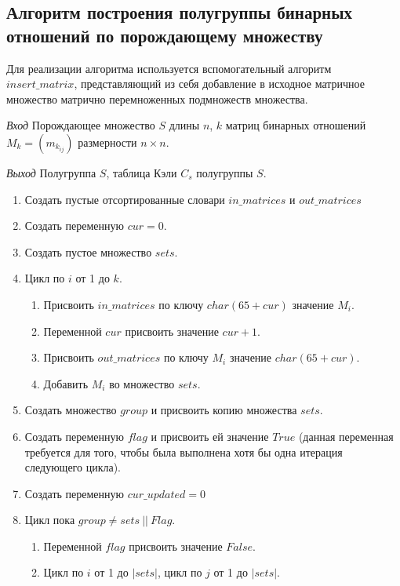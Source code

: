\documentclass[bachelor, och, labwork]{shiza}
\begin{document}
\subsection{Алгоритм построения полугруппы бинарных отношений по порождающему множеству}

Для реализации алгоритма используется вспомогательный алгоритм\\ $insert\_matrix$,
представляющий из себя добавление в исходное матричное множество матрично перемноженных 
подмножеств множества.

\textit{Вход} Порождающее множество $S$ длины $n$, $k$ матриц бинарных отношений 
$M_k = (m_{k_{ij}})$ размерности $n \times n$.

\textit{Выход} Полугруппа $S$, таблица Кэли $C_s$ полугруппы $S$.

\begin{enumerate}
    \item Создать пустые отсортированные словари $in\_matrices$ и  $out\_matrices$
    \item Создать переменную $cur=0$.
    \item Создать пустое множество $sets$.
    \item Цикл по $i$ от 1 до $k$.
        \begin{enumerate}
            \item Присвоить $in\_matrices$ по ключу $char(65 + cur)$ значение $M_i$.
            \item Переменной $cur$ присвоить значение $cur+1$.
            \item Присвоить $out\_matrices$ по ключу $M_i$ значение $char(65 + cur)$.
            \item Добавить $M_i$ во множество $sets$.
        \end{enumerate}
    \item Создать множество $group$ и присвоить копию множества $sets$.
    \item Создать переменную $flag$ и присвоить ей значение $True$ (данная переменная
    требуется для того, чтобы была выполнена хотя бы одна итерация следующего цикла).
    \item Создать переменную $cur\_updated=0$
    \item Цикл пока $group \not = sets ~||~ Flag$.
        \begin{enumerate}
            \item Переменной $flag$ присвоить значение $False$.
            \item Цикл по $i$ от 1 до $|sets|$, цикл по $j$ от 1 до $|sets|$.

\end{enumerate}
\end{enumerate}
\end{document}
